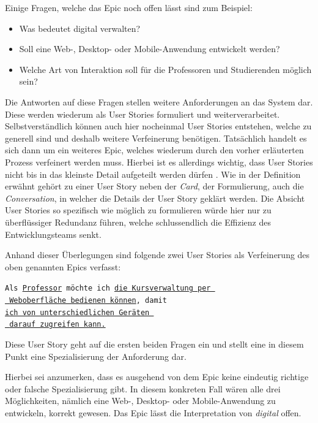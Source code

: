 \documentclass[acmtog]{acmart}
\begin{document}
Einige Fragen, welche das Epic noch offen lässt sind zum Beispiel:

\begin{itemize}[topsep=5pt]
	\item Was bedeutet digital verwalten?
	\item Soll eine Web-, Desktop- oder Mobile-Anwendung entwickelt werden?
	\item Welche Art von Interaktion soll für die Professoren und Studierenden möglich sein?
\end{itemize}

Die Antworten auf diese Fragen stellen weitere Anforderungen an das System dar.
Diese werden wiederum als User Stories formuliert und weiterverarbeitet.
Selbstverständlich können auch hier nocheinmal User Stories entstehen, welche
zu generell sind und deshalb weitere Verfeinerung benötigen.
Tatsächlich handelt es sich dann um ein weiteres Epic, welches wiederum durch den
vorher erläuterten Prozess verfeinert werden muss.
Hierbei ist es allerdings wichtig, dass User Stories nicht bis in das kleinste Detail
aufgeteilt werden dürfen \cite[p. 6]{cohn_user_2004}.
Wie in der Definition erwähnt gehört zu einer User Story neben der \emph{Card}, der Formulierung,
auch die \emph{Conversation}, in welcher die Details der User Story geklärt werden.
Die Absicht User Stories so spezifisch wie möglich zu formulieren würde hier nur zu überflüssiger
Redundanz führen, welche schlussendlich die Effizienz des Entwicklungsteams senkt.

Anhand dieser Überlegungen sind folgende zwei User Stories als Verfeinerung des oben genannten Epics verfasst:

\vspace{1em}
\texttt{Als \underline{Professor} möchte ich \underline{die Kursverwaltung per }\\
	\hspace*{2em} \underline{ Weboberfläche bedienen können}, damit\\
	\hspace*{6em} \underline{ich von unterschiedlichen Geräten }\\
	\hspace*{14em} \underline{ darauf zugreifen kann.}}
\vspace{1em}

Diese User Story geht auf die ersten beiden Fragen ein und stellt eine in diesem Punkt
eine Spezialisierung der Anforderung dar.

Hierbei sei anzumerken, dass es ausgehend von dem Epic keine eindeutig richtige oder
falsche Spezialisierung gibt.
In diesem konkreten Fall wären alle drei Möglichkeiten,
nämlich eine Web-, Desktop- oder Mobile-Anwendung zu entwickeln, korrekt gewesen.
Das Epic lässt die Interpretation von \emph{digital} offen.
\end{document}
